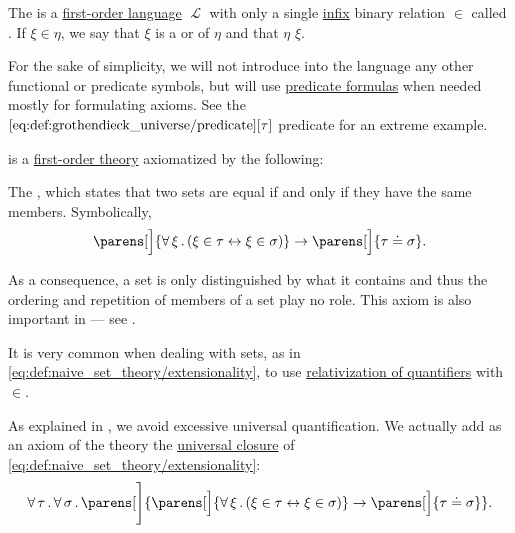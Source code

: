\begin{definition}\label{def:naive_set_theory}
  The  is a \hyperref[def:first_order_syntax]{first-order language} \( \mscrL \) with only a single \hyperref[rem:first_order_formula_conventions/infix]{infix} binary relation \( \in \) called . If \( \xi \in \eta \), we say that \( \xi \) is a  or  of \( \eta \) and that \( \eta \)  \( \xi \).

  For the sake of simplicity, we will not introduce into the language any other functional or predicate symbols, but will use \hyperref[rem:predicate_formula]{predicate formulas} when needed mostly for formulating axioms. See the \( \ref{eq:def:grothendieck_universe/predicate}[\tau] \) predicate for an extreme example.

   is a \hyperref[def:first_order_theory]{first-order theory} axiomatized by the following:
  \begin{thmenum}
     The , which states that two sets are equal if and only if they have the same members. Symbolically,
    \begin{equation}\label{eq:def:naive_set_theory/extensionality}
      \parens[\Big]{ \qforall \xi (\xi \in \tau \leftrightarrow \xi \in \sigma) } \rightarrow \parens[\Big]{ \tau \doteq \sigma }.
    \end{equation}

    As a consequence, a set is only distinguished by what it contains and thus the ordering and repetition of members of a set play no role. This axiom is also important in  --- see .

    It is very common when dealing with sets, as in \eqref{eq:def:naive_set_theory/extensionality}, to use \hyperref[rem:first_order_formula_conventions/relativization]{relativization of quantifiers} with \( \in \).

    As explained in , we avoid excessive universal quantification. We actually add as an axiom of the theory the \hyperref[def:universal_closure]{universal closure} of \eqref{eq:def:naive_set_theory/extensionality}:
    \begin{equation}\label{eq:def:naive_set_theory/extensionality_quantified}
      \qforall \tau \qforall \sigma \parens[\Bigg]{ \parens[\Big]{ \qforall \xi (\xi \in \tau \leftrightarrow \xi \in \sigma) } \rightarrow \parens[\Big]{ \tau \doteq \sigma } }.
    \end{equation}


\end{thmenum}
\end{definition}
